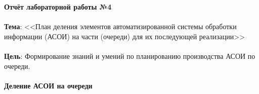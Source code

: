\documentclass[12pt, a4paper, simple]{eskdtext}
\def \gpiDocNum {4}
\def \gpiTopicRep {План деления элементов автоматизированной системы обработки информации (АСОИ)
на части (очереди) для их последующей реализации}
\def \gpiDocTopic {Отчёт лабораторной работы №\gpiDocNum}
\begin{document}
    
    \thispagestyle{plain}
    \pagestyle{plain}

    \begin{center}
        \textbf{\gpiDocTopic}
    \end{center}

    \paragraph{} \textbf{Тема}: <<\gpiTopicRep>>

    \paragraph{} \textbf{Цель}:
    Формирование знаний и умений по планированию производства АСОИ по очереди.

    \paragraph{Деление АСОИ на очереди}
\end{document}
